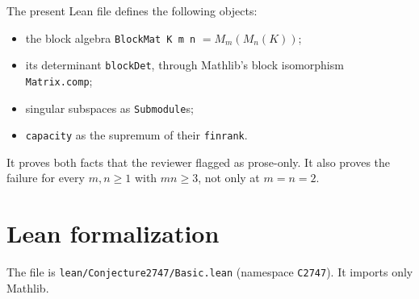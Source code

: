 \documentclass[11pt]{article}
\renewcommand{\_}{\oldus\allowbreak}
\theoremstyle{definition}
\theoremstyle{remark}
\begin{document}
The present Lean file defines the following objects:
\begin{itemize}
\item the block algebra \texttt{BlockMat K m n} $=M_m(M_n(K))$;
\item its determinant \texttt{blockDet}, through Mathlib's block isomorphism \texttt{Matrix.comp};
\item singular subspaces as \texttt{Submodule}s;
\item \texttt{capacity} as the supremum of their \texttt{finrank}.
\end{itemize}
It proves both facts that the reviewer flagged as prose-only. It also proves the failure for every
$m,n\ge1$ with $mn\ge3$, not only at $m=n=2$.

\section{Lean formalization}
The file is \texttt{lean/Conjecture2747/Basic.lean} (namespace \texttt{C2747}). It imports only Mathlib.
\end{document}
